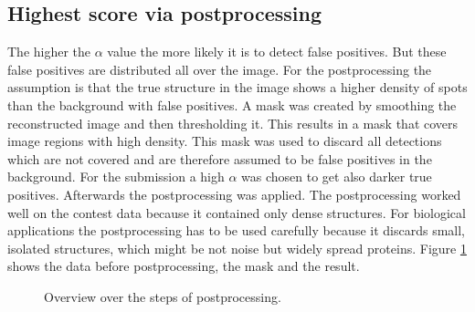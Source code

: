 \subsection{Highest score via postprocessing}
The higher the $\alpha$ value the more likely it is to detect false positives. But these false positives are distributed all over the image. For the postprocessing the assumption is that the true structure in the image shows a higher density of spots than the background with false positives. A mask was created by smoothing the reconstructed image and then thresholding it. This results in a mask that covers image regions with high density. This mask was used to discard all detections which are not covered and are therefore assumed to be false positives in the background.\newline
For the submission a high $\alpha$ was chosen to get also darker true positives. Afterwards the postprocessing was applied. The postprocessing worked well on the contest data because it contained only dense structures. For biological applications the postprocessing has to be used carefully because it discards small, isolated structures, which might be not noise but widely spread proteins.\newline
Figure \ref{postproc} shows the data before postprocessing, the mask and the result.
\begin{figure}
\hfill
{}\hfill	
{}

\caption{Overview over the steps of postprocessing.}
\label{postproc}	

\end{figure}


